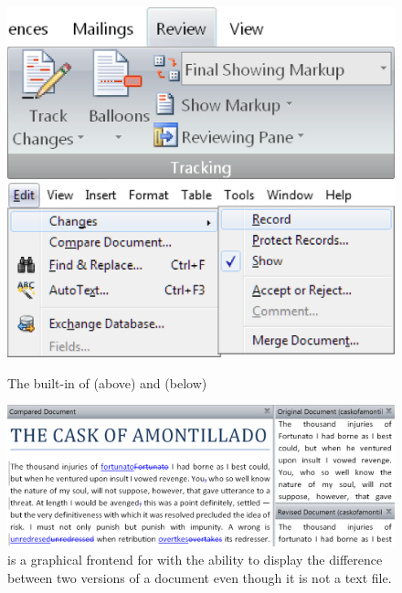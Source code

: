 \begin{figure}
  \includegraphics[width=\textwidth]{examples/01/word.png}\nextimage
  \includegraphics[width=\textwidth]{examples/01/openoffice.png}
  \caption{The built-in  of  (above) and
     (below)}
\end{figure}

\begin{figure}
  \includegraphics[width=\textwidth]{examples/01/tortoise-svn.png}
  \caption{ is a graphical frontend for
     with the ability to display the difference between two versions
    of a  document even though it is not a text file.}
\end{figure}

